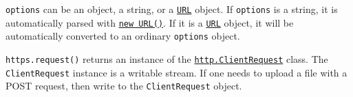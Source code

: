 \texttt{options} can be an object, a string, or a
\href{url.md\#the-whatwg-url-api}{\texttt{URL}} object. If
\texttt{options} is a string, it is automatically parsed with
\href{url.md\#new-urlinput-base}{\texttt{new\ URL()}}. If it is a
\href{url.md\#the-whatwg-url-api}{\texttt{URL}} object, it will be
automatically converted to an ordinary \texttt{options} object.

\texttt{https.request()} returns an instance of the
\href{http.md\#class-httpclientrequest}{\texttt{http.ClientRequest}}
class. The \texttt{ClientRequest} instance is a writable stream. If one
needs to upload a file with a POST request, then write to the
\texttt{ClientRequest} object.

\begin{Shaded}
\begin{Highlighting}[]
\OperatorTok{=} \NormalTok{(}\NormalTok{)}\OperatorTok{;}

\OperatorTok{=}\NormalTok{ \{}
  \OperatorTok{:} \OperatorTok{,}
  \OperatorTok{:} \OperatorTok{,}
  \OperatorTok{:} \StringTok{\textquotesingle{}/\textquotesingle{}}\OperatorTok{,}
  \OperatorTok{:} \OperatorTok{,}
\NormalTok{\}}\OperatorTok{;}

\OperatorTok{=}\OperatorTok{,}\KeywordTok{=\textgreater{}}\NormalTok{ \{}
  \NormalTok{(}\OperatorTok{,}\NormalTok{)}\OperatorTok{;}
  \NormalTok{(}\OperatorTok{,}\NormalTok{)}\OperatorTok{;}

\NormalTok{(}\OperatorTok{,}\KeywordTok{=\textgreater{}}\NormalTok{ \{}
    \OperatorTok{;}
\NormalTok{  \})}\OperatorTok{;}
\NormalTok{\})}\OperatorTok{;}

\NormalTok{(}\OperatorTok{,}\KeywordTok{=\textgreater{}}\NormalTok{ \{}
  \OperatorTok{;}
\NormalTok{\})}\OperatorTok{;}
\NormalTok{()}\OperatorTok{;}
\end{Highlighting}
\end{Shaded}

